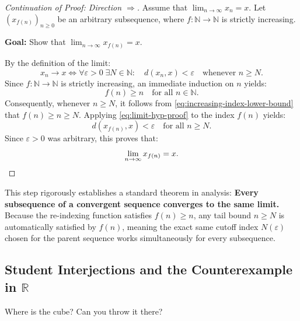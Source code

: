 \begin{content}
\begin{proof}[Continuation of Proof: Direction \texorpdfstring{$\Longrightarrow$}{=>}]
Assume that $\lim_{n \to \infty} x_n = x$. Let $(x_{f(n)})_{n \ge 0}$ be an arbitrary subsequence, where $f \colon \mathbb{N} \to \mathbb{N}$ is strictly increasing.

\textbf{Goal:} Show that $\lim_{n \to \infty} x_{f(n)} = x$.

By the definition of the limit:
\begin{equation}\label{eq:limit-hyp-proof}
x_n \to x \iff \forall \varepsilon > 0 \;\exists N \in \mathbb{N} \colon \quad d(x_n, x) < \varepsilon \quad \text{whenever } n \ge N.
\end{equation}
Since $f \colon \mathbb{N} \to \mathbb{N}$ is strictly increasing, an immediate induction on $n$ yields:
\begin{equation}\label{eq:increasing-index-lower-bound}
f(n) \ge n \quad \text{for all } n \in \mathbb{N}.
\end{equation}
Consequently, whenever $n \ge N$, it follows from \eqref{eq:increasing-index-lower-bound} that $f(n) \ge n \ge N$.
Applying \eqref{eq:limit-hyp-proof} to the index $f(n)$ yields:
\[
d(x_{f(n)}, x) < \varepsilon \quad \text{for all } n \ge N.
\]
Since $\varepsilon > 0$ was arbitrary, this proves that:
\[
\lim_{n \to \infty} x_{f(n)} = x. \qedhere
\]
\end{proof}

\begin{steps}
This step rigorously establishes a standard theorem in analysis: \textbf{Every subsequence of a convergent sequence converges to the same limit.}
Because the re-indexing function satisfies $f(n) \ge n$, any tail bound $n \ge N$ is automatically satisfied by $f(n)$, meaning the exact same cutoff index $N(\varepsilon)$ chosen for the parent sequence works simultaneously for every subsequence.
\end{steps}
\end{content}

\subsection{Student Interjections and the Counterexample in \texorpdfstring{$\mathbb{R}$}{R}}

\begin{speech}[00:35:20 - 00:35:37]
Where is the cube? Can you throw it there? 
\end{speech}

